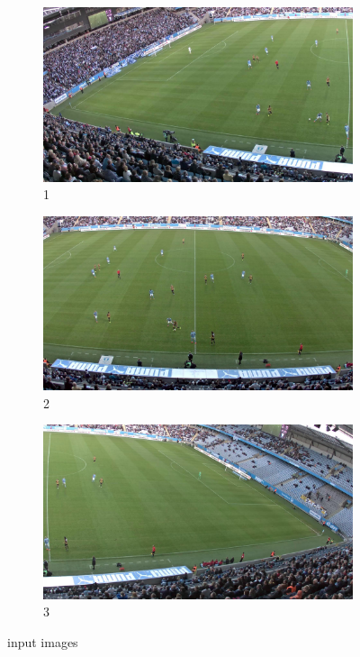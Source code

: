 \begin{figure}[t]
	\centering
	\begin{subfigure}[t]{0.3\textwidth}
		\centering
		\includegraphics[width=\textwidth]{../data/20150521_194353_C1D8.jpg}
		\caption{1}
	\end{subfigure}
	\begin{subfigure}[t]{0.3\textwidth}
		\centering
		\includegraphics[width=\textwidth]{../data/20150521_194353_FD1E.jpg}
		\caption{2}
	\end{subfigure}
		\begin{subfigure}[t]{0.3\textwidth}
		\centering
		\includegraphics[width=\textwidth]{../data/20150521_194353_49E3.jpg}
		\caption{3}
	\end{subfigure}
	\caption{input images}
	\label{fig:input}
\end{figure}




